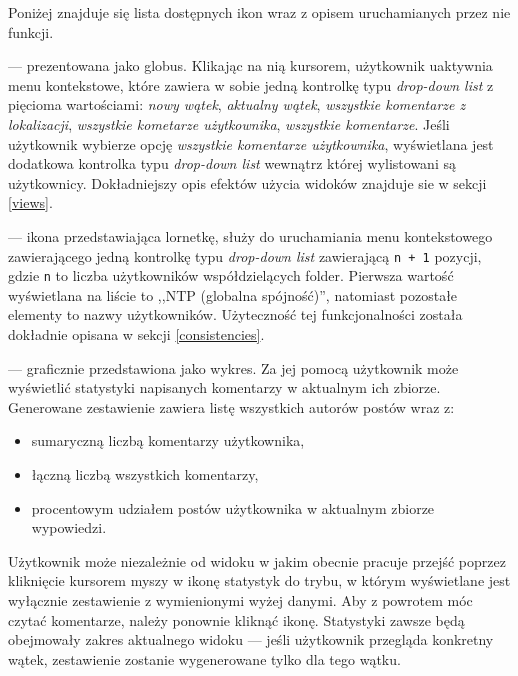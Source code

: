 \documentclass[polish,a4paper,twoside]{ppfcmthesis}
\begin{document}
Poniżej znajduje się lista dostępnych ikon wraz z opisem uruchamianych przez nie funkcji.

\begin{description}[noitemsep]
  \item[Ikona zmiany widoków] --- prezentowana jako globus. Klikając na nią kursorem, użytkownik uaktywnia menu kontekstowe, które zawiera w sobie jedną kontrolkę typu \emph{drop-down list} z pięcioma wartościami: \emph{nowy wątek}, \emph{aktualny wątek}, \emph{wszystkie komentarze z lokalizacji}, \emph{wszystkie kometarze użytkownika}, \emph{wszystkie komentarze}. Jeśli użytkownik wybierze opcję \emph{wszystkie komentarze użytkownika}, wyświetlana jest dodatkowa kontrolka typu \emph{drop-down list} wewnątrz której wylistowani są użytkownicy. Dokładniejszy opis efektów użycia widoków znajduje sie w sekcji \ref{views}.
  
  \item[Ikona zmiany spójności] --- ikona przedstawiająca lornetkę, służy do uruchamiania menu kontekstowego zawierającego jedną kontrolkę typu \emph{drop-down list} zawierającą \texttt{n + 1} pozycji, gdzie \texttt{n} to liczba użytkowników współdzielących folder. Pierwsza wartość wyświetlana na liście to ,,NTP (globalna spójność)'', natomiast pozostałe elementy to nazwy użytkowników. Użyteczność tej funkcjonalności została dokładnie opisana w sekcji \ref{consistencies}.
  
  \item[Ikona statystyk] --- graficznie przedstawiona jako wykres. Za jej pomocą użytkownik może wyświetlić statystyki napisanych komentarzy w aktualnym ich zbiorze. Generowane zestawienie zawiera listę wszystkich autorów postów wraz z:
  \begin{itemize}[noitemsep]
    \item sumaryczną liczbą komentarzy użytkownika,
    \item łączną liczbą wszystkich komentarzy,
    \item procentowym udziałem postów użytkownika w aktualnym zbiorze wypowiedzi.
  \end{itemize}
  Użytkownik może niezależnie od widoku w jakim obecnie pracuje przejść poprzez kliknięcie kursorem myszy w ikonę statystyk do trybu, w którym wyświetlane jest wyłącznie zestawienie z wymienionymi wyżej danymi. Aby z powrotem móc czytać komentarze, należy ponownie kliknąć ikonę. Statystyki zawsze będą obejmowały zakres aktualnego widoku --- jeśli użytkownik przegląda konkretny wątek, zestawienie zostanie wygenerowane tylko dla tego wątku.
  

\end{description}
\end{document}

